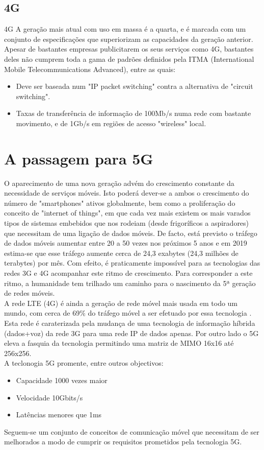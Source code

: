 \documentclass{llncs}
\begin{document}
\subsection{4G}
4G
\hspace*{1.5em}A geração mais atual com uso em massa é a quarta, e é marcada com um conjunto de especificações que superiorizam as capacidades da geração anterior. Apesar de bastantes empresas publicitarem os seus serviços como 4G, bastantes deles não cumprem toda a gama de padrões definidos pela ITMA (International Mobile Telecommunications Advanced), entre as quais\cite{standards}:
\begin{itemize}
    \item Deve ser baseada num "IP packet switching" contra a alternativa de "circuit switching".
    \item Taxas de transferência de informação de 100Mb/s numa rede com bastante movimento, e de 1Gb/s em regiões de acesso "wireless" local.
\end{itemize}

\section{A passagem para 5G}
\hspace*{1.5em}O aparecimento de uma nova geração advém do crescimento constante da necessidade de serviços móveis. Isto poderá dever-se a ambos o crescimento do número de "smartphones" ativos globalmente, bem como a proliferação do conceito de "internet of things", em que cada vez mais existem os mais varados tipos de sistemas embebidos que nos rodeiam (desde frigoríficos a aspiradores) que necessitam de uma ligação de dados móveis. De facto, está previsto o tráfego de dados móveis aumentar entre 20 a 50 vezes nos próximos 5 anos e em 2019 estima-se que esse tráfego aumente cerca de 24,3 exabytes (24,3 milhões de terabytes) por mês. \cite{Fei} Com efeito, é praticamente impossível para as tecnologias das redes 3G e 4G acompanhar este ritmo de crescimento. Para corresponder a este ritmo, a humanidade tem trilhado um caminho para o nascimento da 5ª geração de redes móveis.
\\
\hspace*{1.5em}A rede LTE (4G) é ainda a geração de rede móvel mais usada em todo um mundo, com cerca de 69\% do tráfego móvel a ser efetuado por essa tecnologia \cite{cisco}. Esta rede é caraterizada pela mudança de uma tecnologia de informação híbrida (dados+voz) da rede 3G para uma rede IP de dados apenas.
Por outro lado o 5G eleva a fasquia da tecnologia permitindo uma matriz de MIMO 16x16 até 256x256. \\
A teclonogia 5G promente, entre outros objectivos:
\begin{itemize}
    \item Capacidade 1000 vezes maior
    \item Velocidade 10Gbits/s
    \item Latências menores que 1ms
\end{itemize}
Seguem-se um conjunto de conceitos de comunicação móvel que necessitam de ser melhorados a modo de cumprir os requisitos prometidos pela tecnologia 5G.
\end{document}

